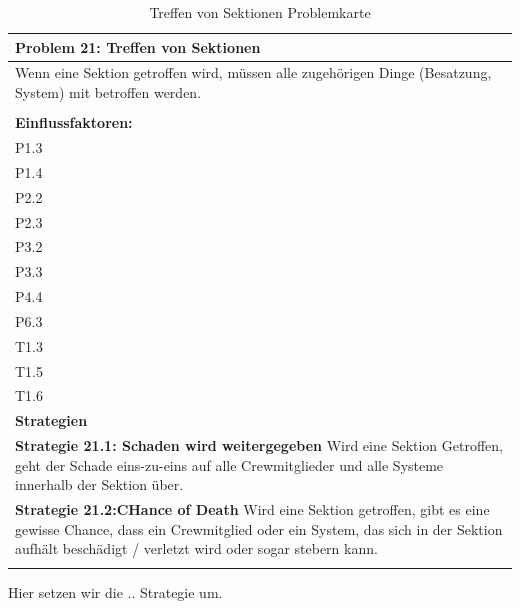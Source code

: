 \documentclass[fontsize=12pt,paper=a4,twoside]{scrartcl}
\begin{document}
\begin{table}[H]
    \centering
    \begin{tabular}{|p{15cm}|}
    \hline
          \textbf{Problem 21: Treffen von Sektionen}  \\ \hline
	Wenn eine Sektion getroffen wird, müssen alle zugehörigen Dinge (Besatzung, System) mit betroffen werden. \\
         \\ \hline
          \textbf{Einflussfaktoren: } \\
	P1.3\\
	P1.4 \\
	P2.2 \\
	P2.3 \\
	P3.2 \\
	P3.3 \\
	P4.4 \\
	P6.3 \\
	T1.3 \\
	T1.5 \\
	T1.6 \\
          \hline
          \textbf{Strategien} \\ \hline
            {}          
           \label{strategie:21.1}     
          \textbf{Strategie 21.1: Schaden wird weitergegeben} Wird eine Sektion Getroffen, geht der Schade eins-zu-eins auf alle Crewmitglieder und alle Systeme innerhalb der Sektion über.  \\        
  {}          
           \label{strategie:21.2}              
          \textbf{Strategie 21.2:CHance of Death} Wird eine Sektion getroffen, gibt es eine gewisse Chance, dass ein Crewmitglied oder ein System, das sich in der Sektion aufhält beschädigt / verletzt wird oder sogar stebern kann.  \\
	 \\ \hline
    \end{tabular}

    \caption{Treffen von Sektionen Problemkarte}
    \label{tab:ProblemKarte21}
\end{table}
Hier setzen wir die .. Strategie um. \\
\end{document}

